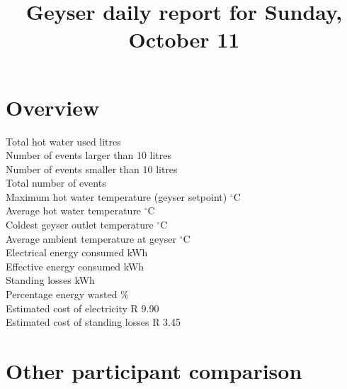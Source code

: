 \documentclass{article}\usepackage[]{graphicx}\usepackage[]{color}
\title{Geyser daily report for Sunday, October 11} %
\date{\vspace{-5ex}} %
\begin{document}
\maketitle %






\section{Overview}



Total hot water used  litres\\
Number of events larger than 10 litres \\
Number of events smaller than 10 litres \\
Total number of events \\

Maximum hot water temperature (geyser setpoint)  $^{\circ}$C\\
Average hot water temperature  $^{\circ}$C\\
Coldest geyser outlet temperature  $^{\circ}$C\\
Average ambient temperature at geyser  $^{\circ}$C\\

Electrical energy consumed  kWh\\
Effective energy consumed  kWh\\
Standing losses  kWh\\
Percentage energy wasted  \%\\
Estimated cost of electricity \dotfill  R 9.90\\
Estimated cost of standing losses \dotfill  R 3.45\\



\section{Other participant comparison}
\end{document}

